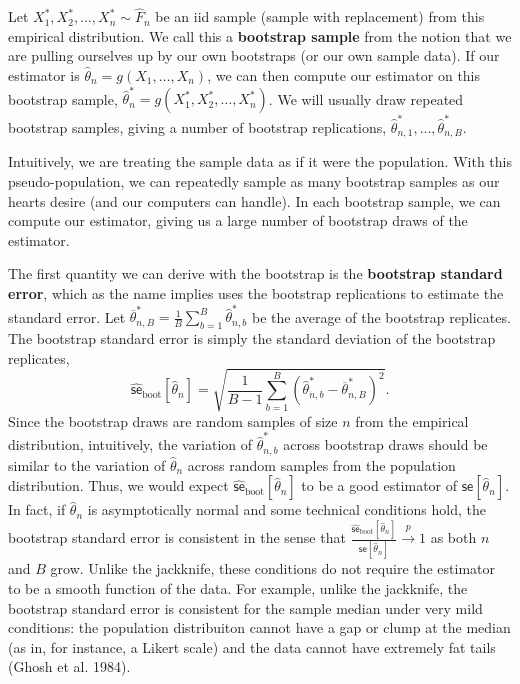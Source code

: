 \documentclass[
  13pt,
  letterpaper,
  DIV=11,
  numbers=noendperiod]{scrreprt}
\newcommand{\se}{\textsf{se}}
\newcommand{\inprob}{\overset{p}{\to}}
\theoremstyle{plain}
\theoremstyle{plain}
\theoremstyle{definition}
\theoremstyle{definition}
\theoremstyle{remark}
\begin{document}
Let \(X^{\ast}_1, X^{\ast}_2, \ldots, X^{\ast}_n \sim \widehat{F}_n\) be
an iid sample (sample with replacement) from this empirical
distribution. We call this a \textbf{bootstrap sample} from the notion
that we are pulling ourselves up by our own bootstraps (or our own
sample data). If our estimator is
\(\widehat{\theta}_n = g(X_1, \ldots, X_n)\), we can then compute our
estimator on this bootstrap sample,
\(\widehat{\theta}^*_n = g(X^{\ast}_1, X^{\ast}_2, \ldots, X^{\ast}_n)\).
We will usually draw repeated bootstrap samples, giving a number of
bootstrap replications,
\(\widehat{\theta}^*_{n,1}, \ldots, \widehat{\theta}^*_{n,B}\).

Intuitively, we are treating the sample data as if it were the
population. With this pseudo-population, we can repeatedly sample as
many bootstrap samples as our hearts desire (and our computers can
handle). In each bootstrap sample, we can compute our estimator, giving
us a large number of bootstrap draws of the estimator.

The first quantity we can derive with the bootstrap is the
\textbf{bootstrap standard error}, which as the name implies uses the
bootstrap replications to estimate the standard error. Let
\(\overline{\theta}^{*}_{n,B} = \tfrac{1}{B} \sum_{b = 1}^B \widehat{\theta}^{*}_{n,b}\)
be the average of the bootstrap replicates. The bootstrap standard error
is simply the standard deviation of the bootstrap replicates, \[
\widehat{\se}_{\text{boot}}[\widehat{\theta}_n] = \sqrt{\frac{1}{B-1} \sum_{b=1}^B (\widehat{\theta}^*_{n,b} - \overline{\theta}^*_{n,B})^2}.
\] Since the bootstrap draws are random samples of size \(n\) from the
empirical distribution, intuitively, the variation of
\(\widehat{\theta}^*_{n,b}\) across bootstrap draws should be similar to
the variation of \(\widehat{\theta}_n\) across random samples from the
population distribution. Thus, we would expect
\(\widehat{\se}_{\text{boot}}[\widehat{\theta}_n]\) to be a good
estimator of \(\se[\widehat{\theta}_n]\). In fact, if
\(\widehat{\theta}_n\) is asymptotically normal and some technical
conditions hold, the bootstrap standard error is consistent in the sense
that
\(\tfrac{\widehat{\se}_{\text{boot}}[\widehat{\theta}_n]}{\se[\widehat{\theta}_n]} \inprob 1\)
as both \(n\) and \(B\) grow. Unlike the jackknife, these conditions do
not require the estimator to be a smooth function of the data. For
example, unlike the jackknife, the bootstrap standard error is
consistent for the sample median under very mild conditions: the
population distribuiton cannot have a gap or clump at the median (as in,
for instance, a Likert scale) and the data cannot have extremely fat
tails (Ghosh et al. 1984).
\end{document}
